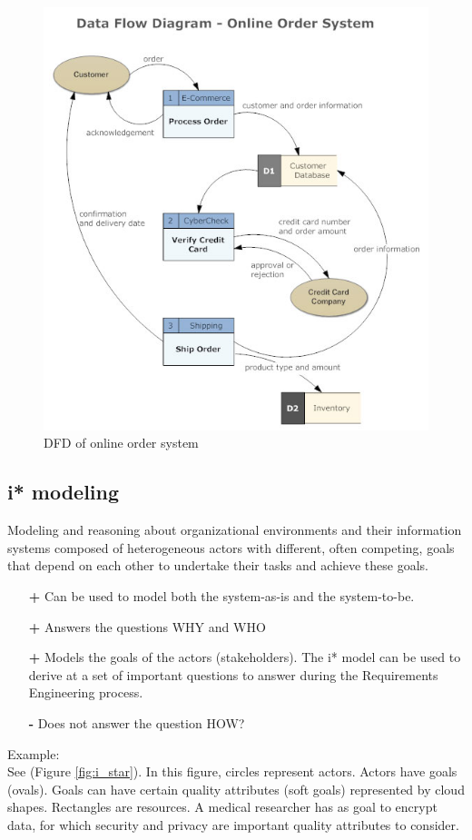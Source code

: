 \begin{figure}[h]
	\centering
	\includegraphics[width=0.75\linewidth]{dfm.jpg}
	\caption{DFD of online order system}
	\label{fig:dfd}
\end{figure}

\subsection*{i* modeling  \cite{i_star}}
Modeling and reasoning about organizational environments and their information systems composed of heterogeneous actors with different, often competing, goals that depend on each other to undertake their tasks and achieve these goals.
\begin{itemize}
	\item[\textbf{+}] Can be used to model both the system-as-is and the system-to-be.
	\item[\textbf{+}] Answers the questions WHY and WHO
	\item[\textbf{+}] Models the goals of the actors (stakeholders). The i* model can be used to derive at a set of important questions to answer during the Requirements Engineering process. 
	\item[\textbf{-}] Does not answer the question HOW?
\end{itemize}

Example:\\
See (Figure \ref{fig:i_star}). In this figure, circles represent actors. Actors have goals (ovals). Goals can have certain quality attributes (soft goals) represented by cloud shapes. Rectangles are resources. A medical researcher has as goal to encrypt data, for which security and privacy are important quality attributes to consider.

